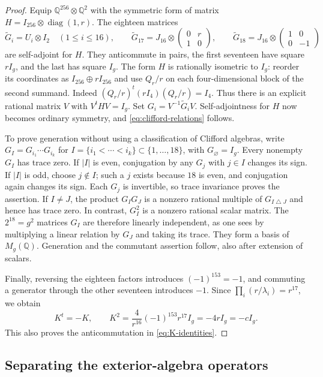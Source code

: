 \documentclass[11pt]{article}
\numberwithin{equation}{section}
\theoremstyle{definition}
\theoremstyle{remark}
\begin{document}
\begin{proof}
Equip $\mathbb Q^{256}\otimes\mathbb Q^2$ with the symmetric form of matrix
$H=I_{256}\otimes\operatorname{diag}(1,r)$.  The eighteen matrices
\[
 \widetilde G_i=U_i\otimes I_2\quad(1\le i\le16),\qquad
 \widetilde G_{17}=J_{16}\otimes
     \begin{pmatrix}0&r\\1&0\end{pmatrix},\qquad
 \widetilde G_{18}=J_{16}\otimes
     \begin{pmatrix}1&0\\0&-1\end{pmatrix}
\]
are self-adjoint for $H$.  They anticommute in pairs, the first seventeen
have square $rI_g$, and the last has square $I_g$.
The form $H$ is rationally isometric to $I_g$: reorder its coordinates
as $I_{256}\oplus rI_{256}$ and use $Q_r/r$ on each four-dimensional
block of the second summand.  Indeed
$(Q_r/r)^t(rI_4)(Q_r/r)=I_4$.
Thus there is an explicit rational matrix $V$ with $V^tHV=I_g$.
Set $G_i=V^{-1}\widetilde G_iV$.  Self-adjointness for $H$ now becomes
ordinary symmetry, and \eqref{eq:clifford-relations} follows.

To prove generation without using a classification of Clifford algebras,
write $G_I=G_{i_1}\cdots G_{i_k}$ for
$I=\{i_1<\cdots<i_k\}\subset\{1,\ldots,18\}$, with $G_\varnothing=I_g$.
Every nonempty $G_I$ has trace zero.  If $|I|$ is even, conjugation by
any $G_j$ with $j\in I$ changes its sign.  If $|I|$ is odd, choose
$j\notin I$; such a $j$ exists because $18$ is even, and conjugation
again changes its sign.  Each $G_j$ is invertible, so trace invariance
proves the assertion.  If $I\ne J$, the product $G_IG_J$ is a nonzero
rational multiple of $G_{I\mathbin{\triangle}J}$ and hence has trace
zero.  In contrast, $G_I^2$ is a nonzero rational scalar matrix.
The $2^{18}=g^2$ matrices $G_I$ are therefore linearly independent,
as one sees by multiplying a linear relation by $G_J$ and taking its
trace.  They form a basis of $M_g(\mathbb Q)$.  Generation and the commutant
assertion follow, also after extension of scalars.

Finally, reversing the eighteen factors introduces
$(-1)^{153}=-1$, and commuting a generator through the other seventeen
introduces $-1$.  Since
$\prod_i(r/\lambda_i)=r^{17}$, we obtain
\[
 K^t=-K,\qquad
 K^2=\frac4{r^{16}}(-1)^{153}r^{17}I_g=-4rI_g=-cI_g.
\]
This also proves the anticommutation in \eqref{eq:K-identities}.
\end{proof}

\subsection{Separating the exterior-algebra operators}
\end{document}
